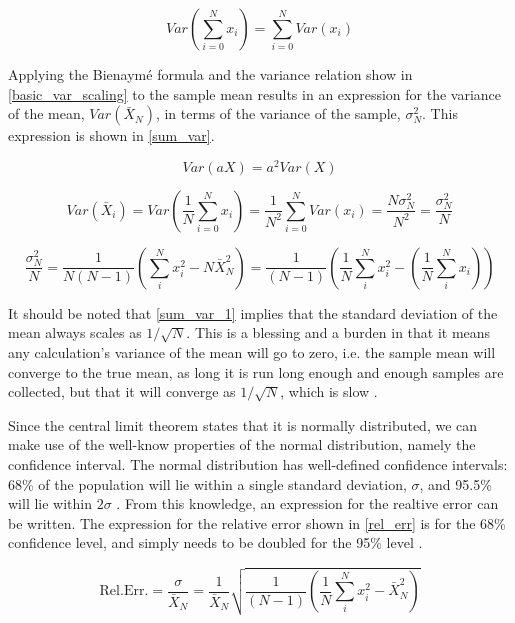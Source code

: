 \begin{equation}
\label{bien}
Var\left(\sum_{i=0}^N x_i \right) = \sum_{i=0}^N Var(x_i)
\end{equation}      


Applying the Bienaym\'e formula and the variance relation show in \eqref{basic_var_scaling} to the sample mean results in an expression for the variance of the mean, $Var(\bar{X}_N)$, in terms of the variance of the sample, $\sigma_N^2$.  This expression is shown in \eqref{sum_var}.  

\begin{equation}
\label{basic_var_scaling}
Var\left(a X \right) = a^2 Var\left( X \right)
\end{equation}

\begin{equation}
\label{sum_var_1}
Var(\bar{X}_i) = Var\left(\frac{1}{N}\sum_{i=0}^N x_i \right) = \frac{1}{N^2} \sum_{i=0}^N Var(x_i) = \frac{N\sigma_N^2}{N^2} =  \frac{\sigma_N^2}{N} 
\end{equation}

\begin{equation}
\label{sum_var}
 \frac{\sigma_N^2}{N} = \frac{1}{N(N-1)} \left( \sum_i^N x_i^2- N\bar{X}_N^2 \right) = \frac{1}{(N-1)} \left( \frac{1}{N} \sum_i^N x_i^2 - \left(   \frac{1}{N} \sum_i^N x_i \right)   \right)
\end{equation}

It should be noted that \eqref{sum_var_1} implies that the standard deviation of the mean always scales as $1/\sqrt{N}$.  This is a blessing and a burden in that it means any calculation's variance of the mean will go to zero, i.e. the sample mean will converge to the true mean, as long it is run long enough and enough samples are collected, but that it will converge as $1/\sqrt{N}$, which is slow \cite{openmc}.

Since the central limit theorem states that it is normally distributed, we can make use of the well-know properties of the normal distribution, namely the confidence interval.  The normal distribution has well-defined confidence intervals: 68\% of the population will lie within a single standard deviation, $\sigma$, and 95.5\% will lie within $2\sigma$ \cite{jaakko}.  From this knowledge, an expression for the realtive error can be written.  The expression for the relative error shown in \eqref{rel_err} is for the 68\% confidence level, and simply needs to be doubled for the 95\% level \cite{mcnp}.

\begin{equation}
\label{rel_err}
\mathrm{Rel. Err.} = \frac{\sigma}{\bar{X}_N} = \frac{1}{\bar{X}_N}\sqrt{\frac{1}{(N-1)} \left( \frac{1}{N}\sum_i^N x_i^2-\bar{X}_N^2 \right)}
\end{equation}

